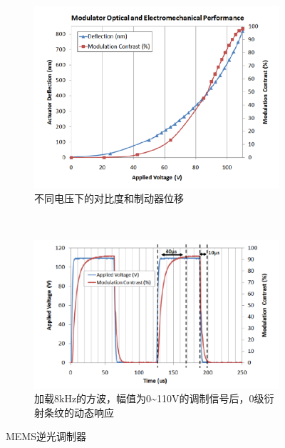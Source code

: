 \begin{figure}[!htbp]
	\centering
	\begin{subfigure}[c]{0.5\textwidth}
		\includegraphics[width=\textwidth]{./Img/MEMS-MRR-VOLTAGE.png}
		\caption{不同电压下的对比度和制动器位移}
		\label{fig:MEMS-MRR-VOLTAGE.png}
	\end{subfigure}%
	~%
	\begin{subfigure}[c]{0.6\textwidth}
		\includegraphics[width=\textwidth]{./Img/MEMS-MRR-RISETIME.png}
		\caption{加载8kHz的方波，幅值为0\textasciitilde 110V的调制信号后，0级衍射条纹的动态响应}
		\label{fig:MEMS-MRR-RISETIME.png}
	\end{subfigure}
	\caption{MEMS逆光调制器}
	\label{fig:MEMS-MRR-table}
\end{figure}

